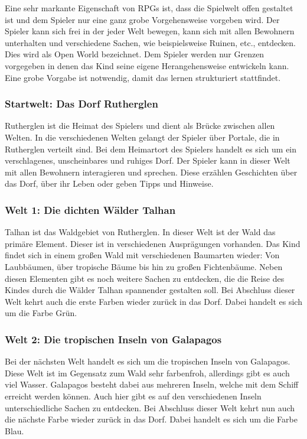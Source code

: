 Eine sehr markante Eigenschaft von \acp{RPG} ist, dass die Spielwelt offen gestaltet ist und dem Spieler nur eine ganz grobe Vorgehensweise vorgeben wird. Der Spieler kann sich frei in der jeder Welt bewegen, kann sich mit allen Bewohnern unterhalten und verschiedene Sachen, wie beispielsweise Ruinen, etc., entdecken. Dies wird als Open World bezeichnet. Dem Spieler werden nur Grenzen vorgegeben in denen das Kind seine eigene Herangehensweise entwickeln kann. Eine grobe Vorgabe ist notwendig, damit das lernen strukturiert stattfindet.

\subsubsection{Startwelt: Das Dorf Rutherglen}
	Rutherglen ist die Heimat des Spielers und dient als Brücke zwischen allen Welten. In die verschiedenen Welten gelangt der Spieler über Portale, die in Rutherglen verteilt sind. Bei dem Heimartort des Spielers handelt es sich um ein verschlagenes, unscheinbares und ruhiges Dorf. Der Spieler kann in dieser Welt mit allen Bewohnern interagieren und sprechen. Diese erzählen Geschichten über das Dorf, über ihr Leben oder geben Tipps und Hinweise.
	
\subsubsection{Welt 1: Die dichten Wälder Talhan}
	Talhan ist das Waldgebiet von Rutherglen. In dieser Welt ist der Wald das primäre Element. Dieser ist in verschiedenen Ausprägungen vorhanden. Das Kind findet sich in einem großen Wald mit verschiedenen Baumarten wieder: Von Laubbäumen, über tropische Bäume bis hin zu großen Fichtenbäume. Neben diesen Elementen gibt es noch weitere Sachen zu entdecken, die die Reise des Kindes durch die Wälder Talhan spannender gestalten soll. Bei Abschluss dieser Welt kehrt auch die erste Farben wieder zurück in das Dorf. Dabei handelt es sich um die Farbe Grün.
	
\subsubsection{Welt 2: Die tropischen Inseln von Galapagos}
	Bei der nächsten Welt handelt es sich um die tropischen Inseln von Galapagos. Diese Welt ist im Gegensatz zum Wald sehr farbenfroh, allerdings gibt es auch viel Wasser. Galapagos besteht dabei aus mehreren Inseln, welche mit dem Schiff erreicht werden können. Auch hier gibt es auf den verschiedenen Inseln unterschiedliche Sachen zu entdecken. Bei Abschluss dieser Welt kehrt nun auch die nächste Farbe wieder zurück in das Dorf. Dabei handelt es sich um die Farbe Blau.
	
